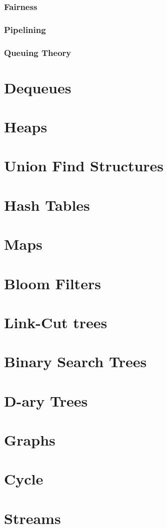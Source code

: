 \documentclass[12pt, letterpaper]{book}
\begin{document}
	\subsection{Fairness}
	\subsection{Pipelining}
	\subsection{Queuing Theory}

\chapter{Dequeues}
\chapter{Heaps}
\chapter{Union Find Structures}
\chapter{Hash Tables}
\chapter{Maps}
\chapter{Bloom Filters}
\chapter{Link-Cut trees}
\chapter{Binary Search Trees}
\chapter{D-ary Trees}
\chapter{Graphs}
\chapter{Cycle}
\chapter{Streams} \label{streams}
\end{document}
